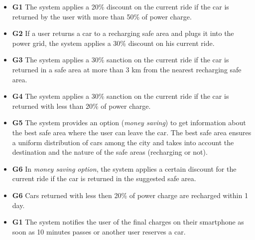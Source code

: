 \begin{itemize}
				\item \textbf{G1} The system applies a 20\% discount on the current ride if the car is returned by the user with more than 50\% of power charge.
				\item \textbf{G2} If a user returns a car to a recharging safe area and plugs it into the power grid, the system applies a 30\% discount on his current ride.
				\item \textbf{G3} The system applies a 30\% sanction on the current ride if the car is returned in a safe area at more than 3 km from the nearest recharging safe area.
				\item \textbf{G4} The system applies a 30\% sanction on the current ride if the car is returned with less than 20\% of power charge.
				\item \textbf{G5} The system provides an option (\textit{money saving}) to get information about the best safe area where the user can leave the car. The best safe area ensures a uniform distribution of cars among the city and takes into account the destination and the nature of the safe areas (recharging or not). %
				\item \textbf{G6} In \textit{money saving option}, the system applies a certain discount for the current ride if the car is returned in the suggested safe area. %
				\item \textbf{G6} Cars returned with less then 20\% of power charge are recharged within 1 day. %
				
				
				\item \textbf{G1} The system notifies the user of the final charges on their smartphone as soon as 10 minutes passes or another user reserves a car. %
			\end{itemize}